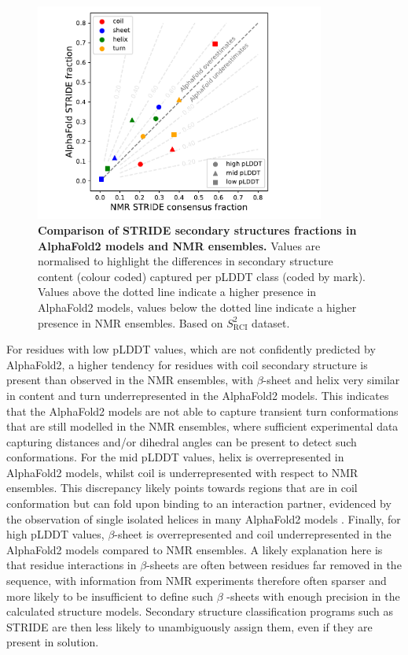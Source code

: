\begin{figure}[htb]
    \centering
    \includegraphics[width=0.85\textwidth]{pLDDT/plddt_figures/scatter_plddt_regions_per_ss_type_abundance_deviation_only_normalised_af_stride_af_ss_nmr_strideCons.pdf}
    \caption{
    \textbf{Comparison of STRIDE secondary structures fractions in AlphaFold2 models and NMR ensembles.} 
    Values are normalised to highlight the differences in secondary structure content (colour coded) captured per pLDDT class (coded by mark). Values above the dotted line indicate a higher presence in AlphaFold2 models, values below the dotted line indicate a higher presence in NMR ensembles.
    Based on $S^2_{\text{RCI}}$ dataset.}
    \label{fig:ss_comparison_scatter_normalised}
\end{figure}

For residues with low pLDDT values, which are not confidently predicted by AlphaFold2, a higher tendency for residues with coil secondary structure is present than observed in the NMR ensembles, with $\beta$-sheet and helix very similar in content and turn underrepresented in the AlphaFold2 models. This indicates that the AlphaFold2 models are not able to capture transient turn conformations that are still modelled in the NMR ensembles, where sufficient experimental data capturing distances and/or dihedral angles can be present to detect such conformations. For the mid pLDDT values, helix is overrepresented in AlphaFold2 models, whilst coil is underrepresented with respect to NMR ensembles. This discrepancy likely points towards regions that are in coil conformation but can fold upon binding to an interaction partner, evidenced by the observation of single isolated helices in many AlphaFold2 models \cite{fossat_uncovering_2023}. Finally, for high pLDDT values, {$\beta$}-sheet is overrepresented and coil underrepresented in the AlphaFold2 models compared to NMR ensembles. A likely explanation here is that residue interactions in {$\beta$}-sheets are often between residues far removed in the sequence, with information from NMR experiments therefore often sparser and more likely to be insufficient to define such $\beta$ -sheets with enough precision in the calculated structure models. Secondary structure classification programs such as STRIDE are then less likely to unambiguously assign them, even if they are present in solution.

